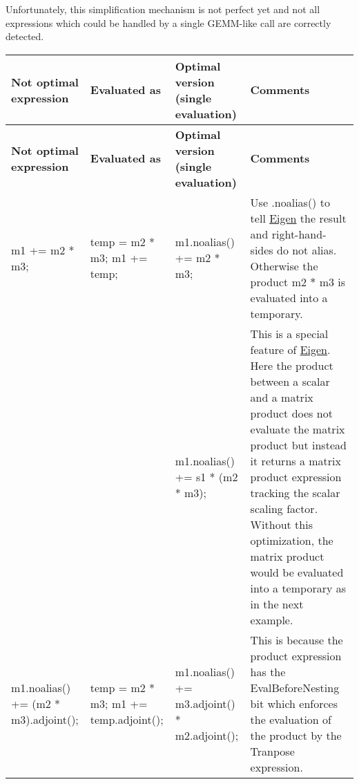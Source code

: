 Unfortunately, this simplification mechanism is not perfect yet and not all expressions which could be handled by a single G\+E\+M\+M-\/like call are correctly detected. \tabulinesep=1mm
\begin{longtabu} spread 0pt [c]{*{4}{|X[-1]}|}
\hline
\rowcolor{\tableheadbgcolor}\textbf{ Not optimal expression }&\textbf{ Evaluated as }&\textbf{ Optimal version (single evaluation) }&\textbf{ Comments  }\\
\endfirsthead
\hline
\endfoot
\hline
\rowcolor{\tableheadbgcolor}\textbf{ Not optimal expression }&\textbf{ Evaluated as }&\textbf{ Optimal version (single evaluation) }&\textbf{ Comments  }\\
\endhead

\begin{DoxyCode}
m1 += m2 * m3; 
\end{DoxyCode}
 &
\begin{DoxyCode}
temp = m2 * m3;
m1 += temp; 
\end{DoxyCode}
 &
\begin{DoxyCode}
m1.noalias() += m2 * m3; 
\end{DoxyCode}
 &Use .noalias() to tell \hyperlink{namespace_eigen}{Eigen} the result and right-\/hand-\/sides do not alias. Otherwise the product m2 $\ast$ m3 is evaluated into a temporary.  \\
&&
\begin{DoxyCode}
m1.noalias() += s1 * (m2 * m3); 
\end{DoxyCode}
 &This is a special feature of \hyperlink{namespace_eigen}{Eigen}. Here the product between a scalar and a matrix product does not evaluate the matrix product but instead it returns a matrix product expression tracking the scalar scaling factor. ~\newline
 Without this optimization, the matrix product would be evaluated into a temporary as in the next example.  \\

\begin{DoxyCode}
m1.noalias() += (m2 * m3).adjoint(); 
\end{DoxyCode}
 &
\begin{DoxyCode}
temp = m2 * m3;
m1 += temp.adjoint(); 
\end{DoxyCode}
 &
\begin{DoxyCode}
m1.noalias() += m3.adjoint()
               * m2.adjoint(); 
\end{DoxyCode}
 &This is because the product expression has the Eval\+Before\+Nesting bit which enforces the evaluation of the product by the Tranpose expression.  \\


\end{longtabu}
